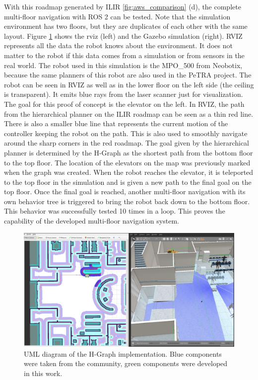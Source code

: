 With this roadmap generated by ILIR \ref{fig:aws_comparison} (d), the complete multi-floor navigation with ROS 2 can be tested. Note that the simulation environment has two floors, but they are duplicates of each other with the same layout. Figure \ref{fig:aws_neobotix_simulation} shows the \gls{rviz} (left) and the Gazebo simulation (right). RVIZ represents all the data the robot knows about the environment. It does not matter to the robot if this data comes from a simulation or from sensors in the real world. The robot used in this simulation is the MPO\_500 from Neobotix, because the same planners of this robot are also used in the PeTRA project. The robot can be seen in RVIZ as well as in the lower floor on the left side (the ceiling is transparent). It emits blue rays from the laser scanner just for visualization. The goal for this proof of concept is the elevator on the left. In RVIZ, the path from the hierarchical planner on the ILIR roadmap can be seen as a thin red line. There is also a smaller blue line that represents the current motion of the controller keeping the robot on the path. This is also used to smoothly navigate around the sharp corners in the red roadmap. The goal given by the hierarchical planner is determined by the H-Graph as the shortest path from the bottom floor to the top floor. The location of the elevators on the map was previously marked when the graph was created. When the robot reaches the elevator, it is teleported to the top floor in the simulation and is given a new path to the final goal on the top floor. Once the final goal is reached, another multi-floor navigation with its own behavior tree is triggered to bring the robot back down to the bottom floor. This behavior was successfully tested 10 times in a loop. This proves the capability of the developed multi-floor navigation system.

\begin{figure}[h]
    \centering
    \includegraphics[width=\textwidth]{figures/60_results/aws_neobotix_simulation.png}
    \caption[UML diagram of the H-Graph implementation]{UML diagram of the H-Graph implementation. Blue components were taken from the community, green components were developed in this work.}
    \label{fig:aws_neobotix_simulation}
\end{figure}

